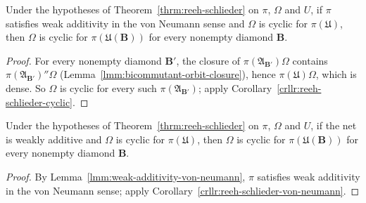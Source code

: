 \begin{corollary}
    \label{crllr:reeh-schlieder-von-neumann}
    \leanok
    Under the hypotheses of Theorem~\ref{thrm:reeh-schlieder} on $\pi$, $\Omega$ and $U$, if $\pi$ satisfies weak additivity in the von Neumann sense and $\Omega$ is cyclic for $\pi(\mathfrak{U})$, then $\Omega$ is cyclic for $\pi(\mathfrak{U}(\mathbf{B}))$ for every nonempty diamond $\mathbf{B}$.
\end{corollary}
\begin{proof}
    \leanok
    For every nonempty diamond $\mathbf{B}'$, the closure of $\pi(\mathfrak{A}_{\mathbf{B}'})\Omega$ contains $\pi(\mathfrak{A}_{\mathbf{B}'})''\Omega$ (Lemma~\ref{lmm:bicommutant-orbit-closure}), hence $\pi(\mathfrak{U})\Omega$, which is dense. So $\Omega$ is cyclic for every such $\pi(\mathfrak{A}_{\mathbf{B}'})$; apply Corollary~\ref{crllr:reeh-schlieder-cyclic}.
\end{proof}

\begin{corollary}
    \label{crllr:reeh-schlieder-weak-additivity}
    \leanok
    Under the hypotheses of Theorem~\ref{thrm:reeh-schlieder} on $\pi$, $\Omega$ and $U$, if the net is weakly additive and $\Omega$ is cyclic for $\pi(\mathfrak{U})$, then $\Omega$ is cyclic for $\pi(\mathfrak{U}(\mathbf{B}))$ for every nonempty diamond $\mathbf{B}$.
\end{corollary}
\begin{proof}
    \leanok
    By Lemma~\ref{lmm:weak-additivity-von-neumann}, $\pi$ satisfies weak additivity in the von Neumann sense; apply Corollary~\ref{crllr:reeh-schlieder-von-neumann}.
\end{proof}

